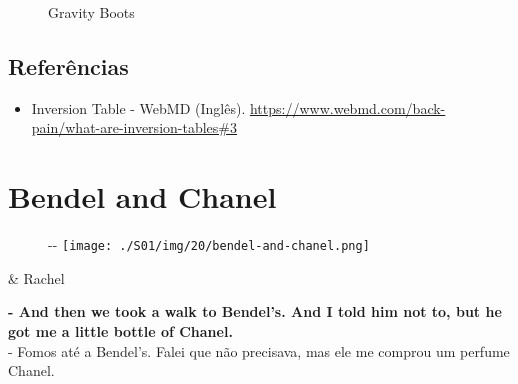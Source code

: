 \begin{figure}
  \centering
    \caption{Gravity Boots\label{fig:gravity-boots}}
\end{figure}

\hypertarget{referuxeancias-1}{%
\subsection{Referências}\label{referuxeancias-1}}

\begin{itemize}
\tightlist
\item
  \sloppy Inversion Table - WebMD (Inglês). \url{https://www.webmd.com/back-pain/what-are-inversion-tables#3}
\end{itemize}

\hypertarget{bendel-and-chanel}{%
\section{Bendel and Chanel}\label{bendel-and-chanel}}

\begin{figure}[!ht]
  \begin{adjustwidth}{-\oddsidemargin-1in}{-\rightmargin}
    \centering
    \texttt{[image: ./S01/img/20/bendel-and-chanel.png]}
  \end{adjustwidth}
\end{figure}

\begin{tcolorbox}[enhanced,center upper,
    drop fuzzy shadow southeast, boxrule=0.3pt,
    lower separated=false, breakable,
    colframe=black!30!dialogoBorder,colback=white]
\begin{minipage}[c]{0.16\linewidth}
   & \centering \scriptsize{Rachel}
\end{minipage}
\hfill
\begin{minipage}[c]{0.8\linewidth}
  \textbf{- And then we took a walk to Bendel's. And I told him not to, but he got me a little bottle of Chanel.}\\
  - Fomos até a Bendel's. Falei que não precisava, mas ele me comprou um perfume Chanel.
\end{minipage}
\end{tcolorbox}

